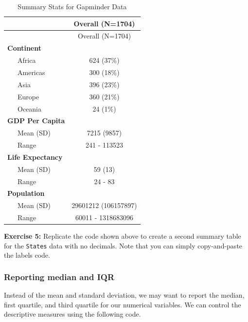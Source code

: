 \documentclass[
]{book}
\newenvironment{rmdblock}[1]
  {\begin{shaded*}
  }
  {\end{shaded*}
  }
\newenvironment{learncheck}
  {\begin{rmdblock}{warning}}
  {\end{rmdblock}}
\begin{document}
\begin{longtable}[]{@{}lc@{}}
\caption{\label{tab:unnamed-chunk-119}Summary Stats for Gapminder Data}\tabularnewline
\toprule\noalign{}
& Overall (N=1704) \\
\midrule\noalign{}
\endfirsthead
\toprule\noalign{}
& Overall (N=1704) \\
\midrule\noalign{}
\endhead
\bottomrule\noalign{}
\endlastfoot
\textbf{Continent} & \\
~~~Africa & 624 (37\%) \\
~~~Americas & 300 (18\%) \\
~~~Asia & 396 (23\%) \\
~~~Europe & 360 (21\%) \\
~~~Oceania & 24 (1\%) \\
\textbf{GDP Per Capita} & \\
~~~Mean (SD) & 7215 (9857) \\
~~~Range & 241 - 113523 \\
\textbf{Life Expectancy} & \\
~~~Mean (SD) & 59 (13) \\
~~~Range & 24 - 83 \\
\textbf{Population} & \\
~~~Mean (SD) & 29601212 (106157897) \\
~~~Range & 60011 - 1318683096 \\
\end{longtable}

\begin{learncheck}
\textbf{Exercise 5:} Replicate the code shown above to create a second
summary table for the \texttt{States} data with no decimals. Note that
you can simply copy-and-paste the labels code.
\end{learncheck}

\hypertarget{reporting-median-and-iqr}{%
\subsubsection{Reporting median and IQR}\label{reporting-median-and-iqr}}

Instead of the mean and standard deviation, we may want to report the median, first quartile, and third quartile for our numerical variables. We can control the descriptive measures using the following code.
\end{document}

